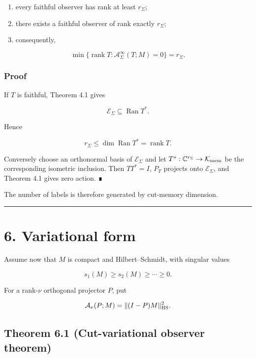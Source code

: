 \begin{enumerate}
\def\labelenumi{\arabic{enumi}.}
\tightlist
\item
  every faithful observer has rank at least \(r_\Sigma\);
\item
  there exists a faithful observer of rank exactly \(r_\Sigma\);
\item
  consequently,
\end{enumerate}

\[
\boxed{
\min\{\operatorname{rank}T:\mathcal A_\Sigma^{\infty}(T;M)=0\}
=r_\Sigma.
}
\]

\hypertarget{proof-1}{%
\subsubsection{Proof}\label{proof-1}}

If \(T\) is faithful, Theorem 4.1 gives

\[
\mathcal E_\Sigma\subseteq\operatorname{Ran}T^*.
\]

Hence

\[
r_\Sigma\le\dim\operatorname{Ran}T^*=\operatorname{rank}T.
\]

Conversely choose an orthonormal basis of \(\mathcal E_\Sigma\) and let
\(T^*:\mathbb C^{r_\Sigma}\to\mathcal K_{\rm mem}\) be the corresponding
isometric inclusion. Then \(TT^*=I\), \(P_T\) projects onto
\(\mathcal E_\Sigma\), and Theorem 4.1 gives zero action. ∎

The number of labels is therefore generated by cut-memory dimension.

\begin{center}\rule{0.5\linewidth}{0.5pt}\end{center}

\hypertarget{variational-form}{%
\section{6. Variational form}\label{variational-form}}

Assume now that \(M\) is compact and Hilbert--Schmidt, with singular values

\[
s_1(M)\ge s_2(M)\ge\cdots\ge0.
\]

For a rank-\(\nu\) orthogonal projector \(P\), put

\[
\mathcal A_\nu(P;M)
=
\|(I-P)M\|_{\rm HS}^2.
\]

\hypertarget{theorem-6.1-cut-variational-observer-theorem}{%
\subsection{Theorem 6.1 (Cut-variational observer theorem)}\label{theorem-6.1-cut-variational-observer-theorem}}


